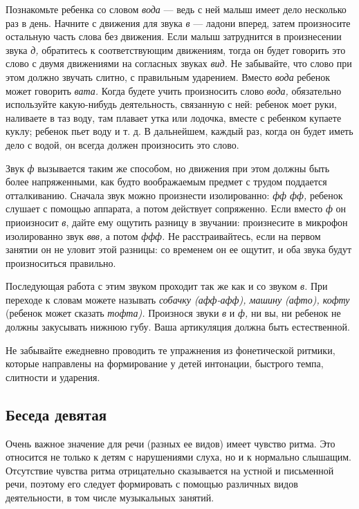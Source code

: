 \documentclass[a5paper]{book}
\renewcommand{\emph}[1]{\textit{#1}}
\begin{document}
Познакомьте ребенка со словом \emph{вода} --- ведь с ней малыш имеет
дело несколько раз в день. Начните с движения для звука \emph{в} ---
ладони вперед, затем произносите остальную часть слова без движения.
Если малыш затруднится в произнесении звука \emph{д,} обратитесь к
соответствующим движениям, тогда он будет говорить это слово с двумя
движениями на согласных звуках \emph{вид.} Не забывайте, что слово при
этом должно звучать слитно, с правильным ударением. Вместо \emph{вода}
ребенок может говорить \emph{вата.} Когда будете учить произносить слово
\emph{вода,} обязательно используйте какую-нибудь деятельность,
связанную с ней: ребенок моет руки, наливаете в таз воду, там плавает
утка или лодочка, вместе с ребенком купаете куклу; ребенок пьет воду и
т. д. В дальнейшем, каждый раз, когда он будет иметь дело с водой, он
всегда должен произносить это слово.

Звук \emph{ф} вызывается таким же способом, но движения при этом должны
быть более напряженными, как будто воображаемым предмет с трудом
поддается отталкиванию. Сначала звук можно произнести изолированно:
\emph{фф фф,} ребенок слушает с помощью аппарата, а потом действует
сопряженно. Если вместо \emph{ф} он приоизносит \emph{в}, дайте ему
ощутить разницу в звучании: произнесите в микрофон изолированно звук
\emph{ввв,} а потом \emph{ффф.} Не расстраивайтесь, если на первом
занятии он не уловит этой разницы: со временем он ее ощутит, и оба звука
будут произноситься правильно.

Последующая работа с этим звуком проходит так же как и со звуком
\emph{в.} При переходе к словам можете называть \emph{собачку (афф-афф),
машину (афто), кофту} (ребенок может сказать \emph{тофта).} Произнося
звуки \emph{в} и \emph{ф,} ни вы, ни ребенок не должны закусывать нижнюю
губу. Ваша артикуляция должна быть естественной.

Не забывайте ежедневно проводить те упражнения из фонетической ритмики,
которые направлены на формирование у детей интонации, быстрого темпа,
слитности и ударения.

\subsection*{Беседа девятая}

Очень важное значение для речи (разных ее видов) имеет чувство ритма.
Это относится не только к детям с нарушениями слуха, но и к нормально
слышащим. Отсутствие чувства ритма отрицательно сказывается на устной и
письменной речи, поэтому его следует формировать с помощью различных
видов деятельности, в том числе музыкальных занятий.
\end{document}
